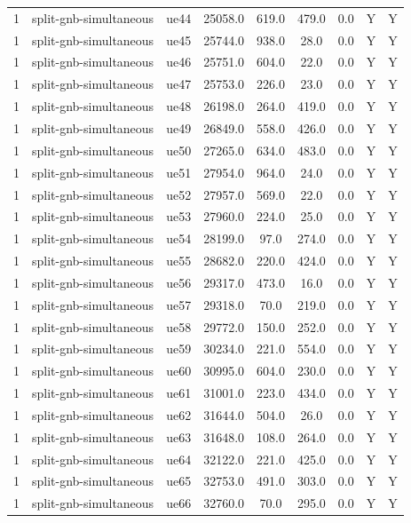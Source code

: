 \begin{table}[ht]
\begin{tabular}{|c|c|c|c|c|c|c|c|c|}
1 & split-gnb-simultaneous & ue44 & 25058.0 & 619.0 & 479.0 & 0.0 & Y & Y \\
1 & split-gnb-simultaneous & ue45 & 25744.0 & 938.0 & 28.0 & 0.0 & Y & Y \\
1 & split-gnb-simultaneous & ue46 & 25751.0 & 604.0 & 22.0 & 0.0 & Y & Y \\
1 & split-gnb-simultaneous & ue47 & 25753.0 & 226.0 & 23.0 & 0.0 & Y & Y \\
1 & split-gnb-simultaneous & ue48 & 26198.0 & 264.0 & 419.0 & 0.0 & Y & Y \\
1 & split-gnb-simultaneous & ue49 & 26849.0 & 558.0 & 426.0 & 0.0 & Y & Y \\
1 & split-gnb-simultaneous & ue50 & 27265.0 & 634.0 & 483.0 & 0.0 & Y & Y \\
1 & split-gnb-simultaneous & ue51 & 27954.0 & 964.0 & 24.0 & 0.0 & Y & Y \\
1 & split-gnb-simultaneous & ue52 & 27957.0 & 569.0 & 22.0 & 0.0 & Y & Y \\
1 & split-gnb-simultaneous & ue53 & 27960.0 & 224.0 & 25.0 & 0.0 & Y & Y \\
1 & split-gnb-simultaneous & ue54 & 28199.0 & 97.0 & 274.0 & 0.0 & Y & Y \\
1 & split-gnb-simultaneous & ue55 & 28682.0 & 220.0 & 424.0 & 0.0 & Y & Y \\
1 & split-gnb-simultaneous & ue56 & 29317.0 & 473.0 & 16.0 & 0.0 & Y & Y \\
1 & split-gnb-simultaneous & ue57 & 29318.0 & 70.0 & 219.0 & 0.0 & Y & Y \\
1 & split-gnb-simultaneous & ue58 & 29772.0 & 150.0 & 252.0 & 0.0 & Y & Y \\
1 & split-gnb-simultaneous & ue59 & 30234.0 & 221.0 & 554.0 & 0.0 & Y & Y \\
1 & split-gnb-simultaneous & ue60 & 30995.0 & 604.0 & 230.0 & 0.0 & Y & Y \\
1 & split-gnb-simultaneous & ue61 & 31001.0 & 223.0 & 434.0 & 0.0 & Y & Y \\
1 & split-gnb-simultaneous & ue62 & 31644.0 & 504.0 & 26.0 & 0.0 & Y & Y \\
1 & split-gnb-simultaneous & ue63 & 31648.0 & 108.0 & 264.0 & 0.0 & Y & Y \\
1 & split-gnb-simultaneous & ue64 & 32122.0 & 221.0 & 425.0 & 0.0 & Y & Y \\
1 & split-gnb-simultaneous & ue65 & 32753.0 & 491.0 & 303.0 & 0.0 & Y & Y \\
1 & split-gnb-simultaneous & ue66 & 32760.0 & 70.0 & 295.0 & 0.0 & Y & Y \\

\end{tabular}
\end{table}

